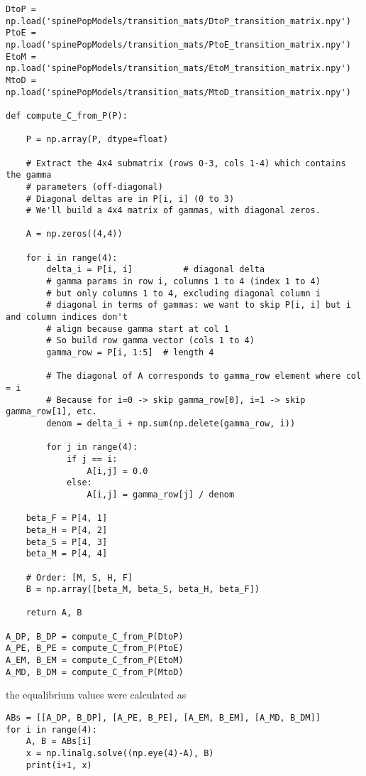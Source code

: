 \documentclass[11pt]{article}
\begin{document}
\begin{Verbatim}[frame=single]
DtoP = np.load('spinePopModels/transition_mats/DtoP_transition_matrix.npy')
PtoE = np.load('spinePopModels/transition_mats/PtoE_transition_matrix.npy')
EtoM = np.load('spinePopModels/transition_mats/EtoM_transition_matrix.npy')
MtoD = np.load('spinePopModels/transition_mats/MtoD_transition_matrix.npy')

def compute_C_from_P(P):

    P = np.array(P, dtype=float)
    
    # Extract the 4x4 submatrix (rows 0-3, cols 1-4) which contains the gamma
    # parameters (off-diagonal)
    # Diagonal deltas are in P[i, i] (0 to 3)
    # We'll build a 4x4 matrix of gammas, with diagonal zeros.
    
    A = np.zeros((4,4))
    
    for i in range(4):
        delta_i = P[i, i]          # diagonal delta
        # gamma params in row i, columns 1 to 4 (index 1 to 4)
        # but only columns 1 to 4, excluding diagonal column i
        # diagonal in terms of gammas: we want to skip P[i, i] but i and column indices don't
        # align because gamma start at col 1
        # So build row gamma vector (cols 1 to 4)
        gamma_row = P[i, 1:5]  # length 4
        
        # The diagonal of A corresponds to gamma_row element where col = i
        # Because for i=0 -> skip gamma_row[0], i=1 -> skip gamma_row[1], etc.
        denom = delta_i + np.sum(np.delete(gamma_row, i))
        
        for j in range(4):
            if j == i:
                A[i,j] = 0.0
            else:
                A[i,j] = gamma_row[j] / denom

    beta_F = P[4, 1]
    beta_H = P[4, 2]
    beta_S = P[4, 3]
    beta_M = P[4, 4]
    
    # Order: [M, S, H, F]
    B = np.array([beta_M, beta_S, beta_H, beta_F])
    
    return A, B
    
A_DP, B_DP = compute_C_from_P(DtoP)
A_PE, B_PE = compute_C_from_P(PtoE)
A_EM, B_EM = compute_C_from_P(EtoM)
A_MD, B_DM = compute_C_from_P(MtoD)
\end{Verbatim}
the equalibrium values were calculated as
\begin{Verbatim}[frame=single]
ABs = [[A_DP, B_DP], [A_PE, B_PE], [A_EM, B_EM], [A_MD, B_DM]]
for i in range(4):
    A, B = ABs[i]
    x = np.linalg.solve((np.eye(4)-A), B)
    print(i+1, x)
\end{Verbatim}
\end{document}
